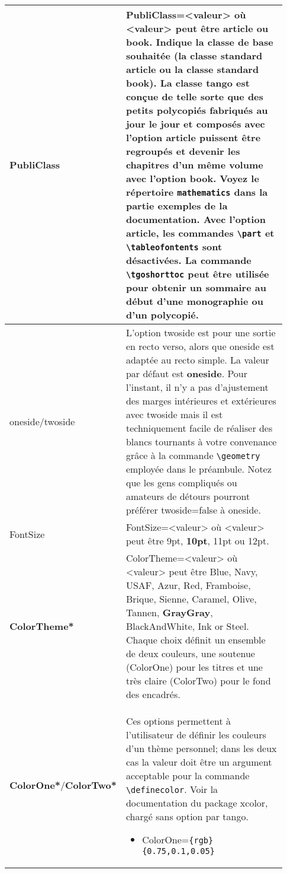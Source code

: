\documentclass[french,ColorTheme=USAF,FontSize=10pt]{tango}
\newcommand\DO[1]{\textcolor{ColorOne}{\bfseries #1}}
\newcommand\TO[1]{\textsf{#1}}
\begin{document}
\begin{longtable}{p{0.23\linewidth}p{0.7\linewidth}}
\hline
\TO{PubliClass}&\TO{PubliClass=<valeur>} où \TO{<valeur>} peut  être  \TO{\DO{article}} ou \TO{book}. Indique la classe de base souhaitée (la classe standard  \TO{article} ou la classe standard \TO{book}). La classe tango est conçue de telle sorte que des petits polycopiés fabriqués au jour le jour et composés avec l'option  \TO{article} puissent être regroupés et devenir les chapitres d'un même volume avec l'option \TO{book}. Voyez le répertoire  \texttt{mathematics} dans la partie exemples de la  documentation. Avec l'option \TO{article}, les commandes \verb=\part= et \verb=\tableofontents= sont désactivées. La commande \verb=\tgoshorttoc= peut être utilisée pour obtenir un sommaire au début d'une monographie ou d'un polycopié.\\
\hline
\TO{oneside/twoside}& L'option \TO{twoside} est pour une sortie en recto verso, alors que \TO{oneside} est adaptée au recto simple. La valeur par défaut est \TO{\DO{oneside}}. Pour l'instant, il n'y a pas d'ajustement des marges intérieures et extérieures avec \TO{twoside} mais il est techniquement facile de réaliser des blancs tournants à votre convenance grâce à la commande \verb=\geometry= employée dans le préambule. Notez que les gens compliqués ou amateurs de détours pourront préférer \TO{twoside=false} à \TO{oneside}.\\
\hline
\TO{FontSize}&\TO{FontSize=<valeur>} où \TO{<valeur>} peut être \TO{9pt}, \TO{\DO{10pt}}, \TO{11pt} ou \TO{12pt}.\\
\hline
\TO{\textbf{ColorTheme*}}&\TO{ColorTheme=<valeur>} où  \TO{<valeur>} peut être \TO{Blue, Navy, USAF, Azur, Red, Framboise, Brique, Sienne, Caramel, Olive, Tannen, \DO{GrayGray}, BlackAndWhite, Ink} or \TO{Steel}. Chaque choix définit un ensemble de deux couleurs, une soutenue (ColorOne) pour les titres et une très claire (ColorTwo) pour le fond des encadrés.\\
\hline
\TO{\textbf{ColorOne*}/\textbf{ColorTwo*}}& Ces options permettent à l'utilisateur de définir les couleurs d'un thème personnel; dans les deux cas la valeur doit être un argument acceptable pour la commande \verb=\definecolor=. Voir la documentation du package xcolor, chargé sans option par tango. 
\begin{example}[Exemples]
 \begin{itemize}
 \item\TO{ColorOne=}\verb={rgb}{0.75,0.1,0.05}=

\end{itemize}
\end{example}
\end{longtable}
\end{document}
